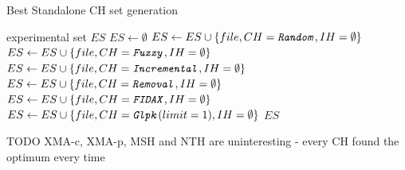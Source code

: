 \begin{algorithm}
\caption{Best Standalone CH set generation}
\label{listing-experiment-best-standalone-ch}
\begin{algorithmic}
\ENSURE experimental set $ES$
\STATE $ES \gets \emptyset$
    	\STATE $ES \gets ES \cup \{file, CH = \texttt{\textit{Random}}, IH = \emptyset\}$
    	\STATE $ES \gets ES \cup \{file, CH = \texttt{\textit{Fuzzy}}, IH = \emptyset\}$
    	\STATE $ES \gets ES \cup \{file, CH = \texttt{\textit{Incremental}}, IH = \emptyset\}$
    	\STATE $ES \gets ES \cup \{file, CH = \texttt{\textit{Removal}}, IH = \emptyset\}$
    	\STATE $ES \gets ES \cup \{file, CH = \texttt{\textit{FIDAX}}, IH = \emptyset\}$
    	\STATE $ES \gets ES \cup \{file, CH = \texttt{\textit{Glpk}}(limit = 1), IH = \emptyset\}$
  \ENDFOR
\ENDFOR
\RETURN $ES$
\end{algorithmic}
\end{algorithm}

TODO XMA-c, XMA-p, MSH and NTH are uninteresting - every CH found the optimum every time

